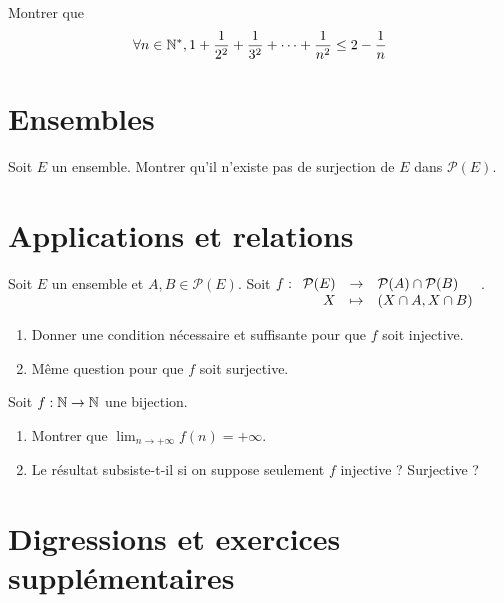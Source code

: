 \documentclass[12pt,a4paper]{exo_book}
\begin{document}
\begin{exo}
    Montrer que
    \[
    \forall n \in \mathbb{N}^*, 1 + \frac{1}{2^2} + \frac{1}{3^2} + \cdots + \frac{1}{n^2} \le 2 - \frac{1}{n}
    \]
\end{exo}

\section{Ensembles}

\begin{exo}
    Soit $E$ un ensemble. Montrer qu'il n'existe pas de surjection de $E$ dans $\mathcal{P}(E)$.
\end{exo}

\section{Applications et relations}

\begin{exo}
    Soit $E$ un ensemble et $A,B \in \mathcal{P}(E)$. Soit $f : \begin{array}[t]{rcl} \mathcal{P}(E) & \to & \mathcal{P}(A) \cap \mathcal{P}(B) \\ X & \mapsto & (X\cap A, X \cap B) \end{array}$.
    \begin{enumerate}
        \item Donner une condition nécessaire et suffisante pour que $f$ soit injective.
        \item Même question pour que $f$ soit surjective.
    \end{enumerate}
\end{exo}

\begin{exo}
    Soit $f : \mathbb{N} \to \mathbb{N}$ une bijection.
    \begin{enumerate}
        \item Montrer que $\lim_{n\to+\infty} f(n) = +\infty$.
        \item Le résultat subsiste-t-il si on suppose seulement $f$ injective ? Surjective ?
    \end{enumerate} 
\end{exo}

\section{Digressions et exercices supplémentaires}
\end{document}
